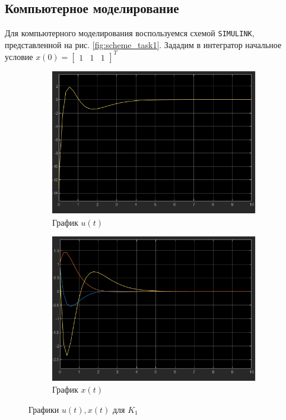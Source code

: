 \documentclass[a4paper, 12pt]{article}
\begin{document}
    \subsection{Компьютерное моделирование}
    Для компьютерного моделирования воспользуемся схемой \texttt{SIMULINK},
    представленной на рис. \ref{fig:scheme_task1}.
    Зададим в интегратор начальное условие $x(0)=\begin{bmatrix}
        1 &1 &1
    \end{bmatrix}^T$
    \begin{figure}[H]
        \centering
        \begin{subfigure}{0.45\textwidth}
            \centering
            \includegraphics[width=\linewidth]{u_t_k1_task1.png}
            \caption{График $u(t)$}
            \label{fig:task_1_u_t_k1}
        \end{subfigure}
        \hfill
        \begin{subfigure}{0.45\textwidth}
            \centering
            \includegraphics[width=\linewidth]{x_t_k1_task1.png}
            \caption{График $x(t)$}
            \label{fig:task_1_x_t_k1}
        \end{subfigure}
        \caption{Графики $u(t),x(t)$ для $K_1$}
        \label{fig:task_1_modeling_1}
    \end{figure}
\end{document}
